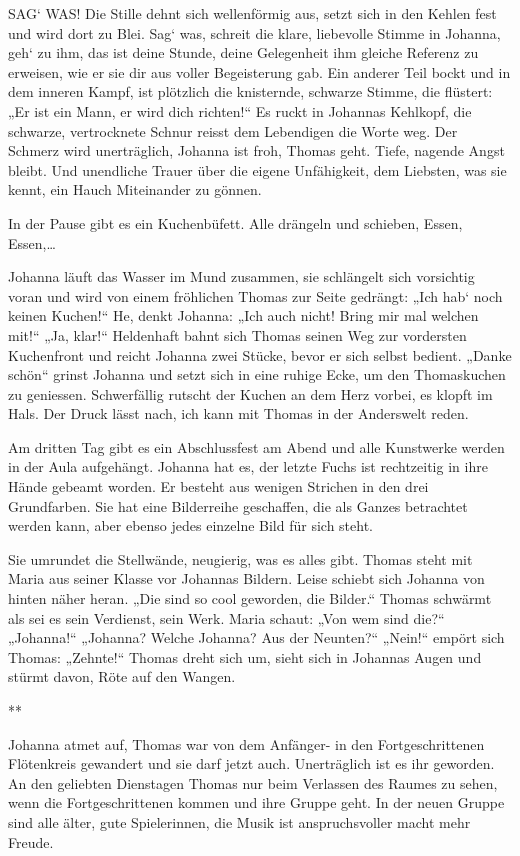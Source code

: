 \documentclass[10pt,titlepage,a5paper]{book}
\newcommand{\sterne}{\par{\centering ***\par}}
\begin{document}
SAG` WAS! Die Stille dehnt sich wellenförmig aus, setzt sich in den Kehlen fest und wird dort zu Blei. Sag` was, schreit die klare, liebevolle Stimme in Johanna, geh` zu ihm, das ist deine Stunde, deine Gelegenheit ihm gleiche Referenz zu erweisen, wie er sie dir aus voller Begeisterung gab.
Ein anderer Teil bockt und in dem inneren Kampf, ist plötzlich die knisternde, schwarze Stimme, die flüstert: „Er ist ein Mann, er wird dich richten!“ Es ruckt in Johannas Kehlkopf, die schwarze, vertrocknete Schnur reisst dem Lebendigen die Worte weg. Der Schmerz wird unerträglich, Johanna ist froh, Thomas geht. Tiefe, nagende Angst bleibt. Und unendliche Trauer über die eigene Unfähigkeit, dem Liebsten, was sie kennt, ein Hauch Miteinander zu gönnen.

In der Pause gibt es ein Kuchenbüfett. Alle drängeln und schieben, Essen, Essen,\dots 

Johanna läuft das Wasser im Mund zusammen, sie schlängelt sich vorsichtig voran und wird von einem fröhlichen Thomas zur Seite gedrängt: „Ich hab` noch keinen Kuchen!“ He, denkt Johanna: „Ich auch nicht! Bring mir mal welchen mit!“ „Ja, klar!“ Heldenhaft  bahnt sich Thomas seinen Weg zur vordersten Kuchenfront und reicht Johanna  zwei Stücke, bevor er sich selbst bedient. „Danke schön“ grinst Johanna und setzt sich in eine ruhige Ecke, um den Thomaskuchen zu geniessen. Schwerfällig rutscht der  Kuchen an dem Herz vorbei, es klopft im Hals. Der Druck lässt nach, ich kann mit Thomas in der Anderswelt reden.

Am dritten Tag gibt es ein Abschlussfest am Abend und alle Kunstwerke werden in der Aula aufgehängt. Johanna hat es, der letzte Fuchs ist rechtzeitig in ihre Hände gebeamt worden. Er besteht aus wenigen Strichen in den drei Grundfarben. Sie hat eine Bilderreihe geschaffen, die als Ganzes betrachtet werden kann, aber ebenso jedes einzelne Bild für sich steht.

Sie umrundet die Stellwände, neugierig, was es alles gibt. Thomas steht mit Maria aus seiner Klasse vor Johannas Bildern. Leise schiebt sich Johanna von hinten näher heran. „Die sind so cool geworden, die Bilder.“ Thomas schwärmt als sei es sein Verdienst, sein Werk. Maria schaut: „Von wem sind die?“ „Johanna!“ „Johanna? Welche Johanna? Aus der Neunten?“ „Nein!“ empört sich Thomas: „Zehnte!“ Thomas dreht sich um, sieht sich in Johannas Augen und stürmt davon, Röte auf den Wangen.


\sterne


Johanna atmet auf, Thomas war von dem Anfänger- in den Fortgeschrittenen Flötenkreis gewandert und sie darf jetzt auch. Unerträglich ist es ihr geworden. An den geliebten Dienstagen Thomas nur beim Verlassen des Raumes zu sehen, wenn die Fortgeschrittenen kommen und ihre Gruppe geht.
In der neuen Gruppe sind alle älter, gute Spielerinnen, die Musik ist anspruchsvoller macht mehr Freude. 
\end{document}
